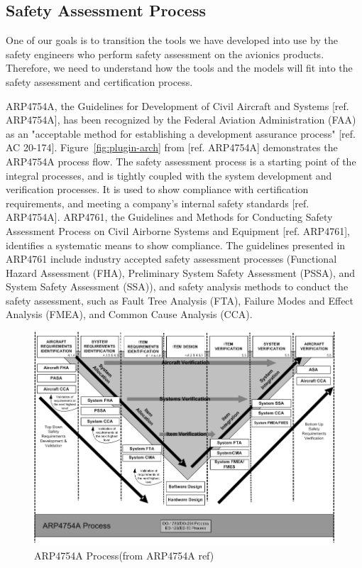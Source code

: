 \subsection{Safety Assessment Process}
\label{subsec:process}

One of our goals is to transition the tools we have developed into use by the safety engineers who perform safety assessment on the avionics products. Therefore, we need to understand how the tools and the models will fit into the safety assessment and certification process.

ARP4754A, the Guidelines for Development of Civil Aircraft and Systems [ref. ARP4754A], has been recognized by the Federal Aviation Administration (FAA) as an "acceptable method for establishing a development assurance process" [ref. AC 20-174]. Figure~\ref{fig:plugin-arch} from [ref. ARP4754A] demonstrates the ARP4754A process flow. The safety assessment process is a starting point of the integral processes, and is tightly coupled with the system development and verification processes. It is used to show compliance with certification requirements, and meeting a company's internal safety standards [ref. ARP4754A]. ARP4761, the Guidelines and Methods for Conducting Safety Assessment Process on Civil Airborne Systems and Equipment [ref. ARP4761], identifies a systematic means to show compliance. The guidelines presented in ARP4761 include industry accepted safety assessment processes (Functional Hazard Assessment (FHA), Preliminary System Safety Assessment (PSSA), and System Safety Assessment (SSA)), and safety analysis methods to conduct the safety assessment, such as Fault Tree Analysis (FTA), Failure Modes and Effect Analysis (FMEA), and Common Cause Analysis (CCA). 

\begin{figure}[h!]
	\vspace{-0.19in}
	\begin{center}
		\includegraphics[trim=0 9 0 5,clip,width=1.0\textwidth]{images/ARP4754A_Process.png}
	\end{center}
	\caption{ARP4754A Process(from ARP4754A ref)}
	\label{fig:arp4754a_process}
\end{figure}

